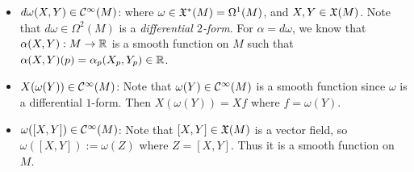 \documentclass[11pt]{article}
\begin{document}
\begin{itemize}
\item $d\omega(X, Y) \in {\mathcal C}^{\infty}(M)$: \quad where $\omega \in {\mathfrak X}^{*}(M) = \Omega^1(M)$, and $X, Y \in {\mathfrak X}(M)$. Note that  $d\omega \in \Omega^2(M)$ is a \emph{differential $2$-form}. For $\alpha = d\omega$, we know that $\alpha(X, Y): M \rightarrow {\mathbb R}$ is a smooth function on $M$ such that $\alpha(X, Y)(p) = \alpha_p(X_p, Y_p) \in {\mathbb R}$.

\item $X(\omega(Y)) \in {\mathcal C}^{\infty}(M)$: \quad Note that $\omega(Y) \in {\mathcal C}^{\infty}(M)$ is a smooth function since $\omega$ is a differential $1$-form. Then $X(\omega(Y)) = Xf$ where $f = \omega(Y)$.

\item $\omega([X, Y]) \in {\mathcal C}^{\infty}(M)$: \quad Note that $[X, Y] \in {\mathfrak X}(M)$ is a vector field, so $\omega([X, Y]) := \omega(Z)$ where $Z = [X, Y]$. Thus it is a smooth function on $M$.
\end{itemize}
\end{document}
